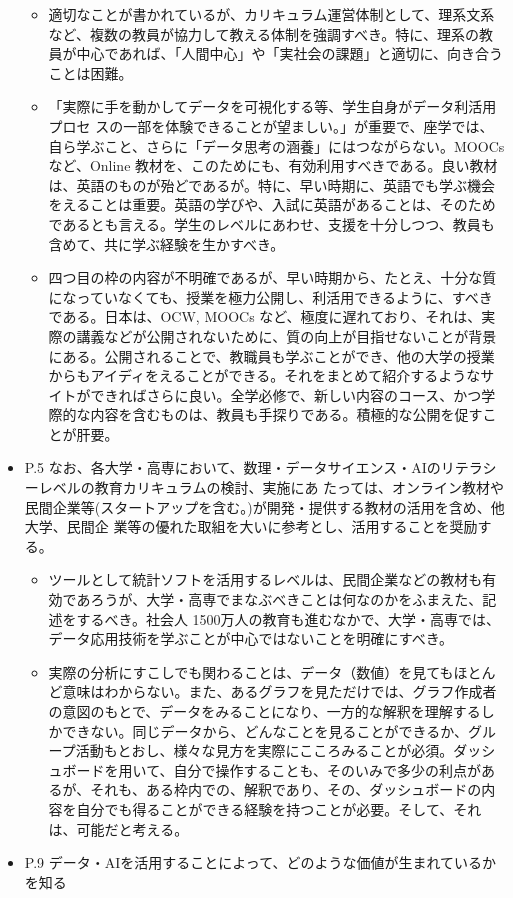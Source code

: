 \documentclass[
]{bxjsbook}
\providecommand{\tightlist}{%
  \setlength{\itemsep}{0pt}\setlength{\parskip}{0pt}}
\theoremstyle{definition}
\theoremstyle{definition}
\theoremstyle{definition}
\theoremstyle{definition}
\theoremstyle{remark}
\begin{document}
\begin{itemize}
  \begin{itemize}
  \tightlist
  \item
    適切なことが書かれているが、カリキュラム運営体制として、理系文系など、複数の教員が協力して教える体制を強調すべき。特に、理系の教員が中心であれば、「人間中心」や「実社会の課題」と適切に、向き合うことは困難。
  \item
    「実際に手を動かしてデータを可視化する等、学生自身がデータ利活用プロセ スの一部を体験できることが望ましい。」が重要で、座学では、自ら学ぶこと、さらに「データ思考の涵養」にはつながらない。MOOCs など、Online 教材を、このためにも、有効利用すべきである。良い教材は、英語のものが殆どであるが。特に、早い時期に、英語でも学ぶ機会をえることは重要。英語の学びや、入試に英語があることは、そのためであるとも言える。学生のレベルにあわせ、支援を十分しつつ、教員も含めて、共に学ぶ経験を生かすべき。
  \item
    四つ目の枠の内容が不明確であるが、早い時期から、たとえ、十分な質になっていなくても、授業を極力公開し、利活用できるように、すべきである。日本は、OCW, MOOCs など、極度に遅れており、それは、実際の講義などが公開されないために、質の向上が目指せないことが背景にある。公開されることで、教職員も学ぶことができ、他の大学の授業からもアイディをえることができる。それをまとめて紹介するようなサイトができればさらに良い。全学必修で、新しい内容のコース、かつ学際的な内容を含むものは、教員も手探りである。積極的な公開を促すことが肝要。
  \end{itemize}
\item
  P.5 なお、各大学・高専において、数理・データサイエンス・AIのリテラシーレベルの教育カリキュラムの検討、実施にあ たっては、オンライン教材や民間企業等(スタートアップを含む。)が開発・提供する教材の活用を含め、他大学、民間企 業等の優れた取組を大いに参考とし、活用することを奨励する。

  \begin{itemize}
  \tightlist
  \item
    ツールとして統計ソフトを活用するレベルは、民間企業などの教材も有効であろうが、大学・高専でまなぶべきことは何なのかをふまえた、記述をするべき。社会人 1500万人の教育も進むなかで、大学・高専では、データ応用技術を学ぶことが中心ではないことを明確にすべき。
  \item
    実際の分析にすこしでも関わることは、データ（数値）を見てもほとんど意味はわからない。また、あるグラフを見ただけでは、グラフ作成者の意図のもとで、データをみることになり、一方的な解釈を理解するしかできない。同じデータから、どんなことを見ることができるか、グループ活動もとおし、様々な見方を実際にこころみることが必須。ダッシュボードを用いて、自分で操作することも、そのいみで多少の利点があるが、それも、ある枠内での、解釈であり、その、ダッシュボードの内容を自分でも得ることができる経験を持つことが必要。そして、それは、可能だと考える。
  \end{itemize}
\item
  P.9 データ・AIを活用することによって、どのような価値が生まれているかを知る


\end{itemize}
\end{document}
